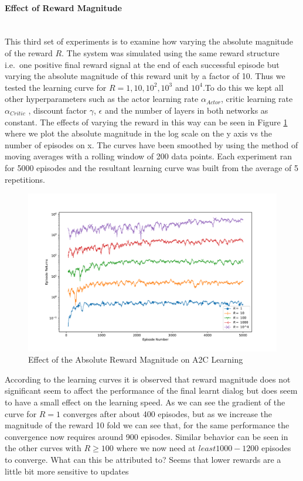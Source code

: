 \documentclass[14pt]{extarticle}
\newcommand{\myparagraph}[1]{\paragraph{#1}\mbox{}\\ \linebreak}
\numberwithin{equation}{section}
\begin{document}
	\myparagraph{Effect of Reward Magnitude}
	This third set of experiments is to examine how varying the absolute magnitude of the reward $R$. The system was simulated using the same reward structure i.e.\ one positive final reward signal at the end of each successful episode but varying the absolute magnitude of this reward unit by a factor of 10. Thus we tested the learning curve for $R = 1, 10, 10^2, 10^3$ and $10^4$.To do this we kept all other hyperparameters such as the actor learning rate $\alpha_{Actor}$, critic learning rate $\alpha_{Critic}$ , discount factor $\gamma$, $\epsilon$ and the number of layers in both networks as constant. The effects of varying the reward in this way can be seen in Figure \ref{a2c_reward_mag} where we plot the absolute magnitude in the log scale on the y axis vs the number of episodes on x. The curves have been smoothed by using the method of moving averages with a rolling window of 200 data points. Each experiment ran for 5000 episodes and the resultant learning curve was built from the average of 5 repetitions. 
	\begin{figure}[H]
		\hspace*{-3.25cm}   
		\centering
		\includegraphics[scale=0.8]{a2c_reward_mag.pdf}
		\caption{Effect of the Absolute Reward Magnitude on A2C Learning
			\label{a2c_reward_mag}}
	\end{figure}
According to the learning curves it is observed that reward magnitude does not significant seem to affect the performance of the final learnt dialog but does seem to have a small effect on the learning speed. As we can see the gradient of the curve for $R = 1$ converges after about 400 episodes, but as we increase the magnitude of the reward 10 fold we can see that, for the same performance the convergence now requires around 900 episodes. Similar behavior can be seen in the other curves with $R \geq 100$ where we now need at $least 1000 - 1200$ episodes to converge. What can this be attributed to? Seems that lower rewards are a little bit more sensitive to updates
\end{document}
